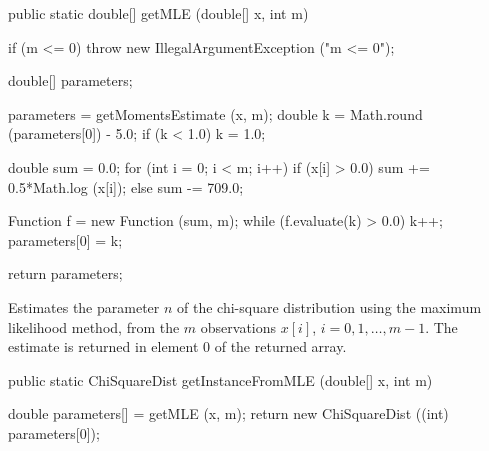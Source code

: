 \begin{code}

   public static double[] getMLE (double[] x, int m)\begin{hide} {
      if (m <= 0)
         throw new IllegalArgumentException ("m <= 0");

      double[] parameters;

      parameters = getMomentsEstimate (x, m);
      double k = Math.round (parameters[0]) - 5.0;
      if (k < 1.0)
         k = 1.0;

      double sum = 0.0;
      for (int i = 0; i < m; i++) {
         if (x[i] > 0.0)
            sum += 0.5*Math.log (x[i]);
         else
            sum -= 709.0;
      }

      Function f = new Function (sum, m);
      while (f.evaluate(k) > 0.0)
         k++;
      parameters[0] = k;

      return parameters;
   }\end{hide}
\end{code}
\begin{tabb}
   Estimates the parameter $n$ of the chi-square distribution
   using the maximum likelihood method, from the $m$ observations
   $x[i]$, $i = 0, 1, \ldots, m-1$. The estimate is returned in element 0
   of the returned array.
\end{tabb}
\begin{htmlonly}
\end{htmlonly}
\begin{code}

   public static ChiSquareDist getInstanceFromMLE (double[] x, int m)\begin{hide} {
      double parameters[] = getMLE (x, m);
      return new ChiSquareDist ((int) parameters[0]);
   }\end{hide}
\end{code}

